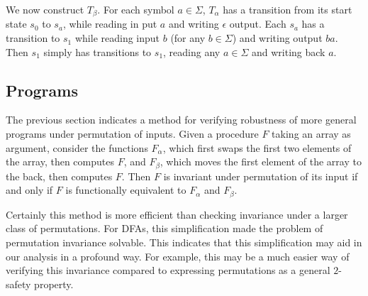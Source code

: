 \documentclass{llncs}
\begin{document}
    We now construct $T_\beta$.
    For each symbol $a \in \Sigma$,
    $T_\alpha$ has a transition from its start
    state $s_0$ to $s_a$, while reading in put $a$ and
    writing $\epsilon$ output.
    Each $s_a$ has a transition to $s_1$ while
    reading input $b$ (for any $b\in \Sigma$)
    and writing output $ba$.
    Then $s_1$ simply has transitions to $s_1$,
    reading any $a\in \Sigma$ and writing
    back $a$.


  \subsection{Programs}
    The previous section indicates a method for verifying
    robustness of more general programs under permutation of inputs.
    Given a procedure $F$ taking an array as argument, consider the functions
    $F_\alpha$, which first swaps the first two elements of the array, then computes
    $F$, and $F_\beta$, which moves the first element of the array to the back, then
    computes $F$. Then $F$ is invariant under permutation of its input if and only
    if $F$ is functionally equivalent to $F_\alpha$ and $F_\beta$.

    Certainly this method is more efficient than checking invariance under a
    larger class of permutations. For DFAs, this simplification made the problem
    of permutation invariance solvable. This indicates that this simplification
    may aid in our analysis in a profound way. For example, this may be a much
    easier way of verifying this invariance compared to expressing permutations
    as a general $2$-safety property.
\end{document}

